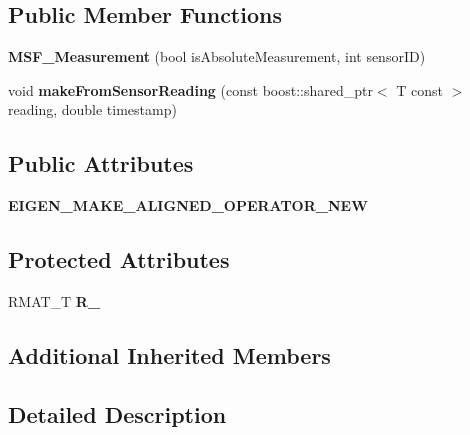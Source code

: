 \subsection*{Public Member Functions}
\begin{DoxyCompactItemize}
\item 
\hypertarget{classmsf__core_1_1MSF__Measurement_a33143412cbcabec0c16e1c6ad82641d0}{{\bfseries M\-S\-F\-\_\-\-Measurement} (bool is\-Absolute\-Measurement, int sensor\-I\-D)}\label{classmsf__core_1_1MSF__Measurement_a33143412cbcabec0c16e1c6ad82641d0}

\item 
\hypertarget{classmsf__core_1_1MSF__Measurement_a345b17105929ac6c70a0a5d21e281a5c}{void {\bfseries make\-From\-Sensor\-Reading} (const boost\-::shared\-\_\-ptr$<$ T const  $>$ reading, double timestamp)}\label{classmsf__core_1_1MSF__Measurement_a345b17105929ac6c70a0a5d21e281a5c}

\end{DoxyCompactItemize}
\subsection*{Public Attributes}
\begin{DoxyCompactItemize}
\item 
\hypertarget{classmsf__core_1_1MSF__Measurement_a481fa3230f73f28a8489223311c3033f}{{\bfseries E\-I\-G\-E\-N\-\_\-\-M\-A\-K\-E\-\_\-\-A\-L\-I\-G\-N\-E\-D\-\_\-\-O\-P\-E\-R\-A\-T\-O\-R\-\_\-\-N\-E\-W}}\label{classmsf__core_1_1MSF__Measurement_a481fa3230f73f28a8489223311c3033f}

\end{DoxyCompactItemize}
\subsection*{Protected Attributes}
\begin{DoxyCompactItemize}
\item 
\hypertarget{classmsf__core_1_1MSF__Measurement_a20fcacb533df8a1e6ae4fad4a3eb06ec}{R\-M\-A\-T\-\_\-\-T {\bfseries R\-\_\-}}\label{classmsf__core_1_1MSF__Measurement_a20fcacb533df8a1e6ae4fad4a3eb06ec}

\end{DoxyCompactItemize}
\subsection*{Additional Inherited Members}


\subsection{Detailed Description}

